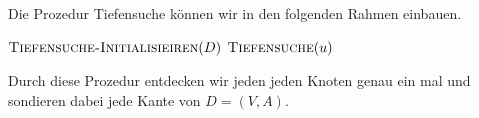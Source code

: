 \begin{bem} 
	Die Prozedur Tiefensuche können wir in den folgenden Rahmen einbauen. 
	\begin{algorithm}[H]
		\caption{$\cc{Vollständige-Tiefensuche}(D)$}
		\begin{algorithmic}[1]
			\STATE $\mathop{\text{\textsc{Tiefensuche-Initialisieiren}}}(D)$ 
			\label{line:tiefensuche-hauptschleife-start}
			\STATE $\mathop{\text{\textsc{Tiefensuche}}}(u)$
			\ENDIF 
			\ENDFOR\label{line:tiefensuche-hauptschleife-ende}
		\end{algorithmic}
	\end{algorithm}
	Durch diese Prozedur entdecken wir jeden jeden Knoten genau ein mal und sondieren dabei jede Kante von $D=(V,A)$. 
\end{bem}




